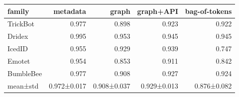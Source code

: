 \begin{tabular}{lrrrr}
\toprule
family & metadata & graph & graph+API & bag-of-tokens \\
\midrule
TrickBot & 0.977 & 0.898 & 0.923 & 0.922 \\
Dridex & 0.995 & 0.953 & 0.945 & 0.945 \\
IcedID & 0.955 & 0.929 & 0.939 & 0.747 \\
Emotet & 0.954 & 0.853 & 0.911 & 0.842 \\
BumbleBee & 0.977 & 0.908 & 0.927 & 0.924 \\
mean±std & 0.972±0.017 & 0.908±0.037 & 0.929±0.013 & 0.876±0.082 \\
\bottomrule
\end{tabular}
